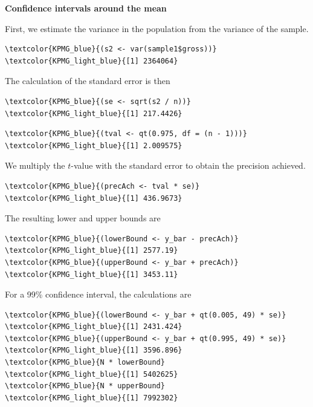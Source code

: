 \begin{exercise}
\label{ex:confidence_intervals}

\textbf{Confidence intervals around the mean}

First, we estimate the variance in the population from the variance of the sample.

\begin{Verbatim}[commandchars=\\\{\}]
\textcolor{KPMG_blue}{(s2 <- var(sample1$gross))}
\textcolor{KPMG_light_blue}{[1] 2364064}
\end{Verbatim}

The calculation of the standard error is then

\begin{Verbatim}[commandchars=\\\{\}]
\textcolor{KPMG_blue}{(se <- sqrt(s2 / n))}
\textcolor{KPMG_light_blue}{[1] 217.4426}
\end{Verbatim}

\begin{Verbatim}[commandchars=\\\{\}]
\textcolor{KPMG_blue}{(tval <- qt(0.975, df = (n - 1)))}
\textcolor{KPMG_light_blue}{[1] 2.009575}
\end{Verbatim}

We multiply the $t$-value with the standard error to obtain the precision achieved.

\begin{Verbatim}[commandchars=\\\{\}]
\textcolor{KPMG_blue}{(precAch <- tval * se)}
\textcolor{KPMG_light_blue}{[1] 436.9673}
\end{Verbatim}

The resulting lower and upper bounds are

\begin{Verbatim}[commandchars=\\\{\}]
\textcolor{KPMG_blue}{(lowerBound <- y_bar - precAch)}
\textcolor{KPMG_light_blue}{[1] 2577.19}
\textcolor{KPMG_blue}{(upperBound <- y_bar + precAch)}
\textcolor{KPMG_light_blue}{[1] 3453.11}
\end{Verbatim}

For a 99\% confidence interval, the calculations are

\begin{Verbatim}[commandchars=\\\{\}]
\textcolor{KPMG_blue}{(lowerBound <- y_bar + qt(0.005, 49) * se)}
\textcolor{KPMG_light_blue}{[1] 2431.424}
\textcolor{KPMG_blue}{(upperBound <- y_bar + qt(0.995, 49) * se)}
\textcolor{KPMG_light_blue}{[1] 3596.896}
\textcolor{KPMG_blue}{N * lowerBound}
\textcolor{KPMG_light_blue}{[1] 5402625}
\textcolor{KPMG_blue}{N * upperBound}
\textcolor{KPMG_light_blue}{[1] 7992302}
\end{Verbatim}

\end{exercise}

